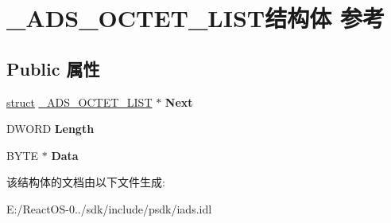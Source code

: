 \hypertarget{struct___a_d_s___o_c_t_e_t___l_i_s_t}{}\section{\+\_\+\+A\+D\+S\+\_\+\+O\+C\+T\+E\+T\+\_\+\+L\+I\+S\+T结构体 参考}
\label{struct___a_d_s___o_c_t_e_t___l_i_s_t}
\subsection*{Public 属性}
\begin{DoxyCompactItemize}
\item 
\mbox{\label{struct___a_d_s___o_c_t_e_t___l_i_s_t_a30b61406635c32d2b13ca1e9462d6146}} 
\hyperlink{interfacestruct}{struct} \hyperlink{struct___a_d_s___o_c_t_e_t___l_i_s_t}{\+\_\+\+A\+D\+S\+\_\+\+O\+C\+T\+E\+T\+\_\+\+L\+I\+ST} $\ast$ {\bfseries Next}
\item 
\mbox{\label{struct___a_d_s___o_c_t_e_t___l_i_s_t_a17db9aed0ab69ab2a01a38768f6a0b5a}} 
D\+W\+O\+RD {\bfseries Length}
\item 
\mbox{\label{struct___a_d_s___o_c_t_e_t___l_i_s_t_a5f1f9c831f7b9a91e6ec09f164426bc0}} 
B\+Y\+TE $\ast$ {\bfseries Data}
\end{DoxyCompactItemize}


该结构体的文档由以下文件生成\+:\begin{DoxyCompactItemize}
\item 
E\+:/\+React\+O\+S-\/0../sdk/include/psdk/iads.\+idl\end{DoxyCompactItemize}
